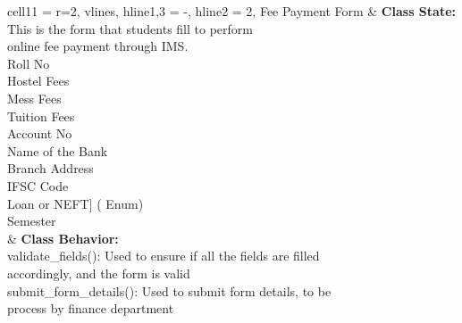 \documentclass[11pt]{article}
\begin{document}
\begin{longtblr}[
  label = none,
  entry = none,
]{
  cell{1}{1} = {r=2}{},
  vlines,
  hline{1,3} = {-}{},
  hline{2} = {2}{},
}
Fee Payment Form & {\textbf{Class State:} This is the form that students fill to perform \\online fee payment through IMS.\\
\hspace{\dimexpr\labelsep+0.5\tabcolsep}Roll No\\
\hspace{\dimexpr\labelsep+0.5\tabcolsep}Hostel Fees\\
\hspace{\dimexpr\labelsep+0.5\tabcolsep}Mess Fees\\
\hspace{\dimexpr\labelsep+0.5\tabcolsep}Tuition Fees\\
\hspace{\dimexpr\labelsep+0.5\tabcolsep}Account No\\
\hspace{\dimexpr\labelsep+0.5\tabcolsep}Name of the Bank\\
\hspace{\dimexpr\labelsep+0.5\tabcolsep}Branch Address\\
\hspace{\dimexpr\labelsep+0.5\tabcolsep}IFSC Code\\
\hspace{\dimexpr\labelsep+0.5\tabcolsep}{[}Loan or NEFT] ( Enum)\\
\hspace{\dimexpr\labelsep+0.5\tabcolsep}Semester} \\
                 & {\textbf{Class Behavior:}\\
\hspace{\dimexpr\labelsep+0.5\tabcolsep}validate\_fields(): Used to ensure if all the fields are filled \\
accordingly, and the form is valid\\
\hspace{\dimexpr\labelsep+0.5\tabcolsep}submit\_form\_details(): Used to submit form details, to be \\
process by finance department}
\end{longtblr}
\end{document}
